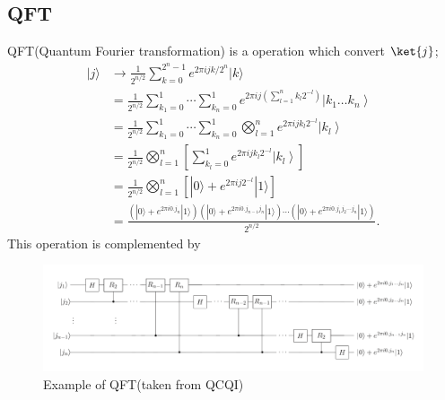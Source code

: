 \documentclass[b5paper,papersize,dvipdfmx,fleqn]{article}
\begin{document}
\subsection{QFT}
QFT(Quantum Fourier transformation) is a operation which convert $\ket{j}$;
$$
\begin{aligned}
|j\rangle & \rightarrow \frac{1}{2^{n / 2}} \sum_{k=0}^{2^{n}-1} e^{2 \pi i j k / 2^{n}}|k\rangle \\
&=\frac{1}{2^{n / 2}} \sum_{k_{1}=0}^{1} \cdots \sum_{k_{n}=0}^{1} e^{2 \pi i j\left(\sum_{l=1}^{n} k_{l} 2^{-l}\right)}\left|k_{1} \ldots k_{n}\right\rangle \\
&=\frac{1}{2^{n / 2}} \sum_{k_{1}=0}^{1} \cdots \sum_{k_{n}=0}^{1} \bigotimes_{l=1}^{n} e^{2 \pi i j k_{l} 2^{-l}}\left|k_{l}\right\rangle \\
&=\frac{1}{2^{n / 2}} \bigotimes_{l=1}^{n}\left[\sum_{k_{l}=0}^{1} e^{2 \pi i j k_{l} 2^{-l}}\left|k_{l}\right\rangle\right] \\
&=\frac{1}{2^{n / 2}} \bigotimes_{l=1}^{n}\left[|0\rangle+e^{2 \pi i j 2^{-l}}|1\rangle\right] \\
&=\frac{\left(|0\rangle+e^{2 \pi i 0 . j_{n}}|1\rangle\right)\left(|0\rangle+e^{2 \pi i 0 . j_{n-1} j_{n}}|1\rangle\right) \cdots\left(|0\rangle+e^{2 \pi i 0 . j_{1} j_{2} \cdots j_{n}}|1\rangle\right)}{2^{n / 2}} .
\end{aligned}
$$
This operation is complemented by
\begin{center}
  \begin{figure}[H]
       \includegraphics[width=\textwidth]{qft.pdf}
       \caption{Example of QFT(taken from QCQI)}
       \label{circuit}
  \end{figure}
\end{center}
\end{document}
